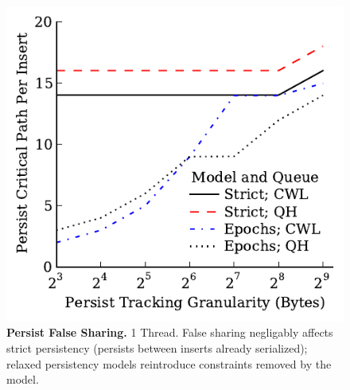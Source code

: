 \begin{figure}
  \centering
  \includegraphics[width=.55\linewidth]{PersistencyEval/FalseSharing.pdf}
  \caption{\textbf{Persist False Sharing.} 1 Thread.  False sharing negligably affects strict persistency (persists between inserts already serialized); relaxed persistency models reintroduce constraints removed by the model.}
  \label{fig::FalseSharing}
\end{figure}
